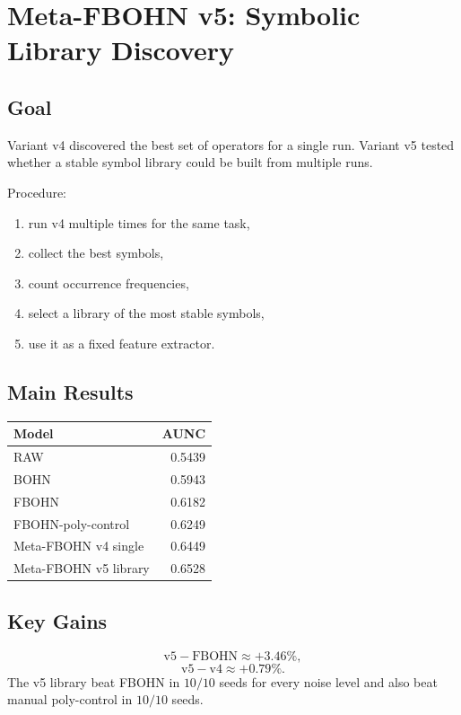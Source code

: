 \section{Meta-FBOHN v5: Symbolic Library Discovery}
\label{sec:meta_fbohn_v5}

\subsection{Goal}
Variant v4 discovered the best set of operators for a single run. Variant v5 tested whether a stable symbol library could be built from multiple runs.

Procedure:
\begin{enumerate}
\item run v4 multiple times for the same task,
\item collect the best symbols,
\item count occurrence frequencies,
\item select a library of the most stable symbols,
\item use it as a fixed feature extractor.
\end{enumerate}

\subsection{Main Results}
\begin{center}
\begin{tabular}{lr}
\toprule
Model & AUNC\\
\midrule
RAW & 0.5439\\
BOHN & 0.5943\\
FBOHN & 0.6182\\
FBOHN-poly-control & 0.6249\\
Meta-FBOHN v4 single & 0.6449\\
Meta-FBOHN v5 library & 0.6528\\
\bottomrule
\end{tabular}
\end{center}

\subsection{Key Gains}
\[
\text{v5}-\text{FBOHN}\approx +3.46\%,
\]
\[
\text{v5}-\text{v4}\approx +0.79\%.
\]
The v5 library beat FBOHN in $10/10$ seeds for every noise level and also beat manual poly-control in $10/10$ seeds.

